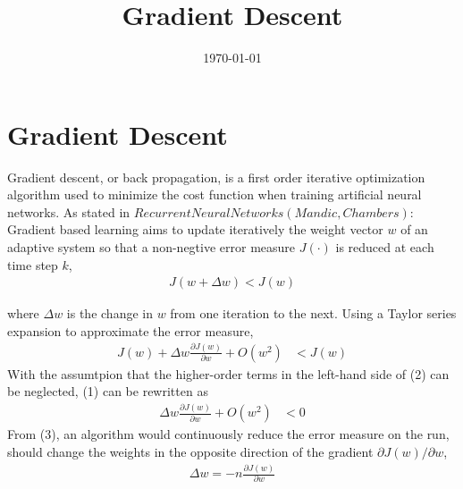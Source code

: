 \documentclass[a4paper, 12pt]{article}
\begin{document}
\title{Gradient Descent}
\date{\today}
\pagestyle{empty} 
\section*{Gradient Descent}
	Gradient descent, or back propagation, is a first order iterative optimization algorithm used to minimize the cost function when training artificial neural networks.  As stated in $Recurrent Neural Networks (Mandic, Chambers)$:\\
	
	Gradient based learning aims to update iteratively the weight vector $w$ of an adaptive system so that a non-negtive error measure $J(\cdot)$ is reduced at each time step $k$,
\begin{align}
J(w + \Delta w) < J(w)
\end{align}

where $\Delta w$ is the change in $w$ from one iteration to the next.  Using a Taylor series expansion to approximate the error measure,
\begin{align}
J(w) + \Delta w \frac{\partial J(w)}{\partial w} + O(w^2) &< J(w)
\end{align}
With the assumtpion that the higher-order terms in the left-hand side of (2) can be neglected, (1) can be rewritten as
\begin{align}
\Delta w \frac{\partial J(w)}{\partial w} + O(w^2) &< 0
\end{align}
From (3), an algorithm would continuously reduce the error measure on the run, should change the weights in the opposite direction of the gradient $\partial J(w) / \partial w$, 
\begin{align}
\Delta w = -n\frac{\partial J(w)}{\partial w}
\end{align}
\end{document}
